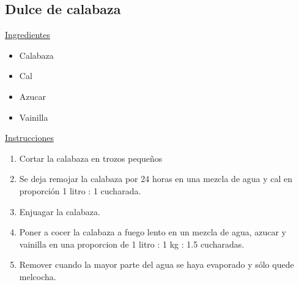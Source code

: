 \subsection{Dulce de calabaza}

\underline{Ingredientes}
\begin{itemize}
\item Calabaza
\item Cal
\item Azucar
\item Vainilla
\end{itemize}

\underline{Instrucciones}
\begin{enumerate}
\item Cortar la calabaza en trozos peque\~nos
\item Se deja remojar la calabaza por 24 horas en una mezcla de agua y cal en proporci\'on 1 litro : 1 cucharada.
\item Enjuagar la calabaza.
\item Poner a cocer la calabaza a fuego lento en un mezcla de agua, azucar y vainilla en una proporcion de 1 litro : 1 kg : 1.5 cucharadas.
\item Remover cuando la mayor parte del agua se haya evaporado y s\'olo quede melcocha. 
\end{enumerate}
